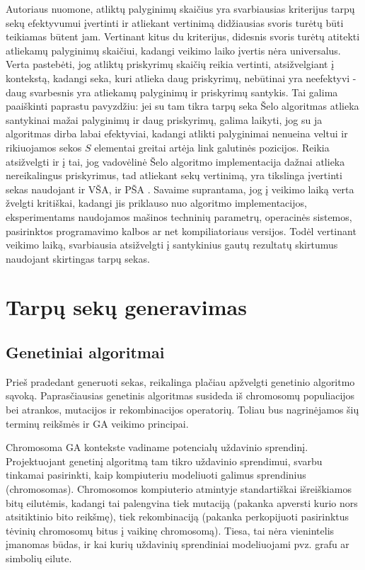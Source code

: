 \documentclass{VUMIFInfKursinis}
\begin{document}
Autoriaus nuomone, atliktų palyginimų skaičius yra svarbiausias kriterijus tarpų sekų efektyvumui įvertinti ir
atliekant vertinimą didžiausias svoris turėtų būti teikiamas būtent jam.
Vertinant kitus du kriterijus, didesnis svoris turėtų atitekti atliekamų palyginimų skaičiui,
kadangi veikimo laiko įvertis nėra universalus.
Verta pastebėti, jog atliktų priskyrimų skaičių reikia vertinti, atsižvelgiant į kontekstą, kadangi
seka, kuri atlieka daug priskyrimų, nebūtinai yra neefektyvi - daug svarbesnis yra atliekamų palyginimų ir priskyrimų santykis.
Tai galima paaiškinti paprastu pavyzdžiu: jei su tam tikra tarpų seka Šelo algoritmas atlieka santykinai mažai palyginimų ir daug priskyrimų, galima laikyti,
jog su ja algoritmas dirba labai efektyviai, kadangi atlikti palyginimai nenueina veltui ir rikiuojamos sekos $S$ elementai greitai artėja link galutinės pozicijos.
Reikia atsižvelgti ir į tai, jog vadovėlinė Šelo algoritmo implementacija dažnai atlieka nereikalingus priskyrimus,
tad atliekant sekų vertinimą, yra tikslinga įvertinti sekas naudojant ir VŠA, ir PŠA \cite{Radavičius_Baranauskas_2013}.
Savaime suprantama, jog į veikimo laiką verta žvelgti kritiškai, kadangi jis priklauso nuo algoritmo implementacijos,
eksperimentams naudojamos mašinos techninių parametrų, operacinės sistemos, pasirinktos programavimo kalbos ar net kompiliatoriaus versijos.
Todėl vertinant veikimo laiką, svarbiausia atsižvelgti į santykinius gautų rezultatų skirtumus naudojant skirtingas tarpų sekas.

\section{Tarpų sekų generavimas}

\subsection{Genetiniai algoritmai}

Prieš pradedant generuoti sekas, reikalinga plačiau apžvelgti genetinio algoritmo sąvoką.
Paprasčiausias genetinis algoritmas susideda iš chromosomų populiacijos bei atrankos, mutacijos ir rekombinacijos operatorių.
Toliau bus nagrinėjamos šių terminų reikšmės ir GA veikimo principai.

Chromosoma GA kontekste vadiname potencialų uždavinio sprendinį.
Projektuojant genetinį algoritmą tam tikro uždavinio sprendimui, svarbu tinkamai pasirinkti,
kaip kompiuteriu modeliuoti galimus sprendinius (chromosomas).
Chromosomos kompiuterio atmintyje standartiškai išreiškiamos bitų eilutėmis,
kadangi tai palengvina tiek mutaciją (pakanka apversti kurio nors atsitiktinio bito reikšmę),
tiek rekombinaciją (pakanka perkopijuoti pasirinktus tėvinių chromosomų bitus į vaikinę chromosomą).
Tiesa, tai nėra vienintelis įmanomas būdas, ir kai kurių uždavinių sprendiniai modeliuojami pvz. grafu ar simbolių eilute.
\end{document}
